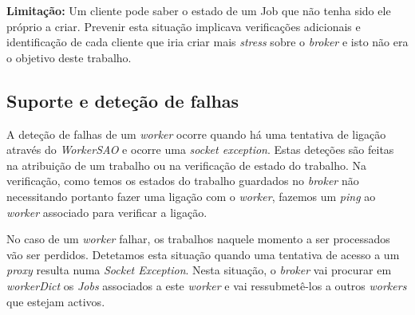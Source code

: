 \documentclass[a4paper]{article}
\begin{document}
\textbf{Limitação:} Um cliente pode saber o estado de um Job que não tenha sido ele próprio a criar. Prevenir esta situação implicava verificações adicionais e identificação de cada cliente que iria criar mais \emph{stress} sobre o \emph{broker} e isto não era o objetivo deste trabalho.


\subsection{Suporte e deteção de falhas}

A deteção de falhas de um \emph{worker} ocorre quando há uma tentativa de ligação através do \emph{WorkerSAO} e ocorre uma \emph{socket exception}. Estas deteções são feitas na atribuição de um trabalho ou na verificação de estado do trabalho. Na verificação, como temos os estados do trabalho guardados no \emph{broker} não necessitando portanto fazer uma ligação com o \emph{worker}, fazemos um \emph{ping} ao \emph{worker} associado para verificar a ligação.

No caso de um \emph{worker} falhar, os trabalhos naquele momento a ser processados vão ser perdidos. Detetamos esta situação quando uma tentativa de acesso a um \emph{proxy} resulta numa \emph{Socket Exception}. Nesta situação, o \emph{broker} vai procurar em \emph{workerDict} os \emph{Jobs} associados a este \emph{worker} e vai ressubmetê-los a outros \emph{workers} que estejam activos.	
	
\end{document}
